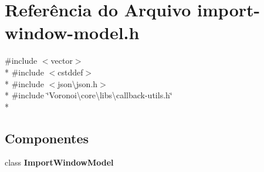 \section{Referência do Arquivo import-\/window-\/model.h}
\label{import-window-model_8h}
{\ttfamily \#include $<$vector$>$}\\*
{\ttfamily \#include $<$cstddef$>$}\\*
{\ttfamily \#include $<$json\textbackslash{}json.\+h$>$}\\*
{\ttfamily \#include \char`\"{}Voronoi\textbackslash{}core\textbackslash{}libs\textbackslash{}callback-\/utils.\+h\char`\"{}}\\*
\subsection*{Componentes}
\begin{DoxyCompactItemize}
\item 
class {\bf Import\+Window\+Model}
\end{DoxyCompactItemize}
